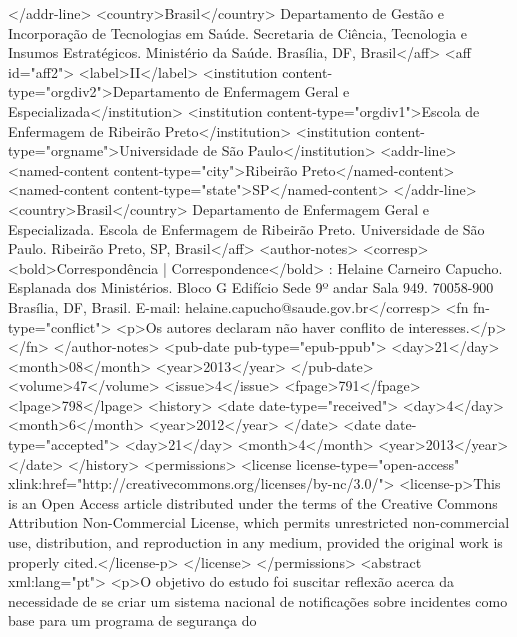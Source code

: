         </addr-line>
        <country>Brasil</country> Departamento de Gestão e Incorporação de Tecnologias em Saúde.
        Secretaria de Ciência, Tecnologia e Insumos Estratégicos. Ministério da Saúde. Brasília,
        DF, Brasil</aff>
      <aff id="aff2">
        <label>II</label>
        <institution content-type="orgdiv2">Departamento de Enfermagem Geral e
          Especializada</institution>
        <institution content-type="orgdiv1">Escola de Enfermagem de Ribeirão Preto</institution>
        <institution content-type="orgname">Universidade de São Paulo</institution>
        <addr-line>
          <named-content content-type="city">Ribeirão Preto</named-content>
          <named-content content-type="state">SP</named-content>
        </addr-line>
        <country>Brasil</country> Departamento de Enfermagem Geral e Especializada. Escola de
        Enfermagem de Ribeirão Preto. Universidade de São Paulo. Ribeirão Preto, SP,
        Brasil</aff>
      <author-notes>
        <corresp>
          <bold>Correspondência | Correspondence</bold> : Helaine Carneiro Capucho. Esplanada dos
          Ministérios. Bloco G Edifício Sede 9º andar Sala 949. 70058-900 Brasília, DF, Brasil.
          E-mail: helaine.capucho@saude.gov.br</corresp>
        <fn fn-type="conflict">
          <p>Os autores declaram não haver conflito de interesses.</p>
        </fn>
      </author-notes>
      <pub-date pub-type="epub-ppub">
        <day>21</day>
        <month>08</month>
        <year>2013</year>
      </pub-date>
      <volume>47</volume>
      <issue>4</issue>
      <fpage>791</fpage>
      <lpage>798</lpage>
      <history>
        <date date-type="received">
          <day>4</day>
          <month>6</month>
          <year>2012</year>
        </date>
        <date date-type="accepted">
          <day>21</day>
          <month>4</month>
          <year>2013</year>
        </date>
      </history>
      <permissions>
        <license license-type="open-access"
          xlink:href="http://creativecommons.org/licenses/by-nc/3.0/">
          <license-p>This is an Open Access article distributed under the terms of the Creative
            Commons Attribution Non-Commercial License, which permits unrestricted non-commercial
            use, distribution, and reproduction in any medium, provided the original work is
            properly cited.</license-p>
        </license>
      </permissions>
      <abstract xml:lang="pt">
        <p>O objetivo do estudo foi suscitar reflexão acerca da necessidade de se criar um sistema
          nacional de notificações sobre incidentes como base para um programa de segurança do

